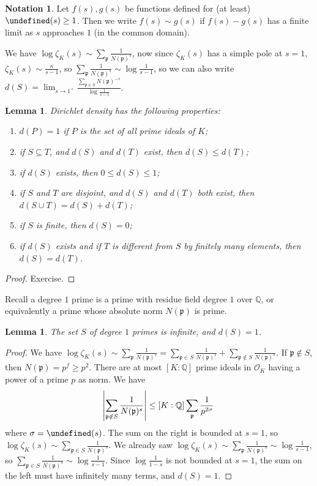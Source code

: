 \documentclass[11pt]{article}
\theoremstyle{definition}
\newtheorem{notation}[definition]{Notation}
\theoremstyle{plain}
\newtheorem{lemma}[definition]{Lemma}
\theoremstyle{remark}
\let\Re\undefined
\DeclareMathOperator{\Re}{Re}
\newcommand{\QQ}{\mathbb{Q}}
\newcommand{\cO}{\mathcal{O}}
\newcommand{\fp}{\mathfrak{p}}
\begin{document}
\begin{notation}\label{not:8_2}
    Let $f(s), g(s)$ be functions defined for (at least) $\Re(s) \ge 1$. Then we write $f(s) \sim g(s)$ if $f(s) - g(s)$ has a finite limit as $s$ approaches $1$ (in the common domain).
\end{notation}

We have $\log \zeta_K(s) \sim \sum_{\fp} \frac{1}{N(\fp)^s}$, now since $\zeta_K(s)$ has a simple pole at $s=1$, $\zeta_K(s) \sim \frac{\kappa}{s-1}$, so $\sum_{\fp} \frac{1}{N(\fp)^s} \sim \log \frac{1}{s-1}$, so we can also write $d(S) = \lim_{s \to 1^+} \frac{\sum_{\fp \in S} N(\fp)^{-s}}{\log \frac{1}{s-1}}$.

\begin{lemma}\label{lem:8_3}
    Dirichlet density has the following properties:
    \begin{enumerate}[label=\roman*)]
        \item $d(P) = 1$ if $P$ is the set of all prime ideals of $K$;
        \item if $S \subseteq T$, and $d(S)$ and $d(T)$ exist, then $d(S) \le d(T)$;
        \item if $d(S)$ exists, then $0 \le d(S) \le 1$;
        \item if $S$ and $T$ are disjoint, and $d(S)$ and $d(T)$ both exist, then $d(S \cup T) = d(S) + d(T)$;
        \item if $S$ is finite, then $d(S) = 0$;
        \item if $d(S)$ exists and if $T$ is different from $S$ by finitely many elements, then $d(S) = d(T)$.
    \end{enumerate}
\end{lemma}
\begin{proof}
    Exercise.
\end{proof}

Recall a degree $1$ prime is a prime with residue field degree $1$ over $\QQ$, or equivalently a prime whose absolute norm $N(\fp)$ is prime.

\begin{lemma}\label{lem:8_4}
    The set $S$ of degree $1$ primes is infinite, and $d(S) = 1$.
\end{lemma}
\begin{proof}
    We have $\log \zeta_K(s) \sim \sum_{\fp} \frac{1}{N(\fp)^s} = \sum_{\fp \in S} \frac{1}{N(\fp)^s} + \sum_{\fp \notin S} \frac{1}{N(\fp)^s}$. If $\fp \notin S$, then $N(\fp) = p^f \ge p^2$. There are at most $[K : \QQ]$ prime ideals in $\cO_K$ having a power of a prime $p$ as norm. We have
    \begin{equation*}
        \abs{\sum_{\fp \notin S} \frac{1}{N(\fp)^s}} \le [K : \QQ] \sum_{\fp} \frac{1}{p^{2 \sigma}}
    \end{equation*}
    where $\sigma = \Re(s)$. The sum on the right is bounded at $s = 1$, so $\log \zeta_K(s) \sim \sum_{\fp \in S} \frac{1}{N(\fp)^s}$. We already saw $\log \zeta_K(s) \sim \sum_{\fp} \frac{1}{N(\fp)^s} \sim \log \frac{1}{s-1}$, so $\sum_{\fp \in S} \frac{1}{N(\fp)^s} \sim \log \frac{1}{s-1}$. Since $\log \frac{1}{1-s}$ is not bounded at $s=1$, the sum on the left must have infinitely many terms, and $d(S) = 1$.
\end{proof}
\end{document}
